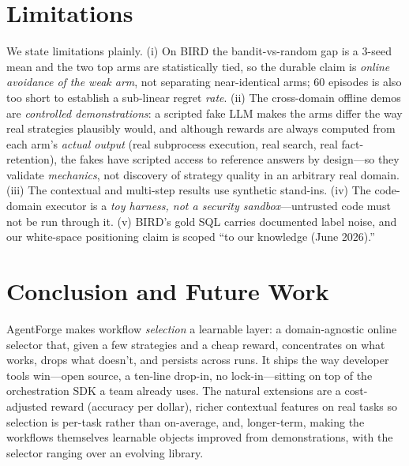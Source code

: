 \documentclass[conference]{IEEEtran}
\begin{document}
\section{Limitations}
We state limitations plainly. (i) On BIRD the bandit-vs-random gap is a $3$-seed
mean and the two top arms are statistically tied, so the durable claim is
\emph{online avoidance of the weak arm}, not separating near-identical arms; $60$
episodes is also too short to establish a sub-linear regret \emph{rate}.
(ii) The cross-domain offline demos are \emph{controlled demonstrations}: a scripted
fake LLM makes the arms differ the way real strategies plausibly would, and although
rewards are always computed from each arm's \emph{actual output} (real subprocess
execution, real search, real fact-retention), the fakes have scripted access to
reference answers by design---so they validate \emph{mechanics}, not discovery of
strategy quality in an arbitrary real domain. (iii) The contextual and multi-step
results use synthetic stand-ins. (iv) The code-domain executor is a \emph{toy
harness, not a security sandbox}---untrusted code must not be run through it.
(v) BIRD's gold SQL carries documented label noise, and our white-space positioning
claim is scoped ``to our knowledge (June 2026).''

\section{Conclusion and Future Work}
AgentForge makes workflow \emph{selection} a learnable layer: a domain-agnostic
online selector that, given a few strategies and a cheap reward, concentrates on what
works, drops what doesn't, and persists across runs. It ships the way developer tools
win---open source, a ten-line drop-in, no lock-in---sitting on top of the
orchestration SDK a team already uses. The natural extensions are a cost-adjusted
reward (accuracy per dollar), richer contextual features on real tasks so selection
is per-task rather than on-average, and, longer-term, making the workflows themselves
learnable objects improved from demonstrations, with the selector ranging over an
evolving library.

\end{document}
